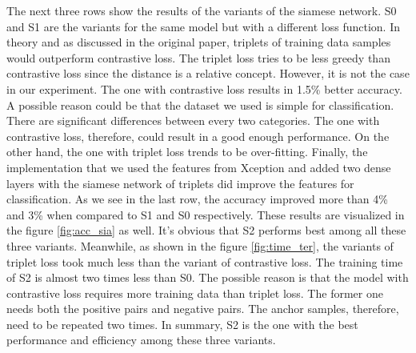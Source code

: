 The next three rows show the results of the variants of the siamese network. S0 and S1 are the variants for the same model but with a different loss function. In theory and as discussed in the original paper, triplets of training data samples would outperform contrastive loss. The triplet loss tries to be less greedy than contrastive loss since the distance is a relative concept. However, it is not the case in our experiment. The one with contrastive loss results in 1.5\% better accuracy. A possible reason could be that the dataset we used is simple for classification. There are significant differences between every two categories. The one with contrastive loss, therefore, could result in a good enough performance. On the other hand, the one with triplet loss trends to be over-fitting. Finally, the implementation that we used the features from Xception and added two dense layers with the siamese network of triplets did improve the features for classification. As we see in the last row, the accuracy improved more than 4\% and 3\% when compared to S1 and S0 respectively. These results are visualized in the figure \ref{fig:acc_sia} as well. It's obvious that S2 performs best among all these three variants. Meanwhile, as shown in the figure \ref{fig:time_ter}, the variants of triplet loss took much less than the variant of contrastive loss. The training time of S2 is almost two times less than S0. The possible reason is that the model with contrastive loss requires more training data than triplet loss. The former one needs both the positive pairs and negative pairs. The anchor samples, therefore, need to be repeated two times. In summary, S2 is the one with the best performance and efficiency among these three variants.

